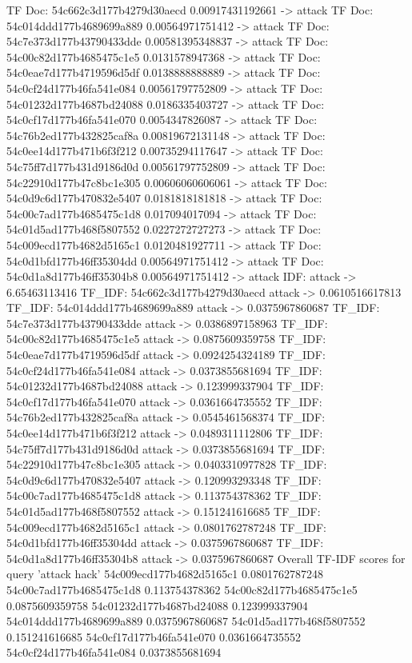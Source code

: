 \documentclass[12pt]{article}
\begin{document}
\begin{spverbatim}
TF Doc: 54c662c3d177b4279d30aecd 0.00917431192661 -> attack
TF Doc: 54c014ddd177b4689699a889 0.00564971751412 -> attack
TF Doc: 54c7e373d177b43790433dde 0.00581395348837 -> attack
TF Doc: 54c00c82d177b4685475c1e5 0.0131578947368 -> attack
TF Doc: 54c0eae7d177b4719596d5df 0.0138888888889 -> attack
TF Doc: 54c0cf24d177b46fa541e084 0.00561797752809 -> attack
TF Doc: 54c01232d177b4687bd24088 0.0186335403727 -> attack
TF Doc: 54c0cf17d177b46fa541e070 0.0054347826087 -> attack
TF Doc: 54c76b2ed177b432825caf8a 0.00819672131148 -> attack
TF Doc: 54c0ee14d177b471b6f3f212 0.00735294117647 -> attack
TF Doc: 54c75ff7d177b431d9186d0d 0.00561797752809 -> attack
TF Doc: 54c22910d177b47c8bc1e305 0.00606060606061 -> attack
TF Doc: 54c0d9c6d177b470832e5407 0.0181818181818 -> attack
TF Doc: 54c00c7ad177b4685475c1d8 0.017094017094 -> attack
TF Doc: 54c01d5ad177b468f5807552 0.0227272727273 -> attack
TF Doc: 54c009ecd177b4682d5165c1 0.0120481927711 -> attack
TF Doc: 54c0d1bfd177b46ff35304dd 0.00564971751412 -> attack
TF Doc: 54c0d1a8d177b46ff35304b8 0.00564971751412 -> attack
IDF:  attack -> 6.65463113416
TF_IDF:  54c662c3d177b4279d30aecd attack -> 0.0610516617813
TF_IDF:  54c014ddd177b4689699a889 attack -> 0.0375967860687
TF_IDF:  54c7e373d177b43790433dde attack -> 0.0386897158963
TF_IDF:  54c00c82d177b4685475c1e5 attack -> 0.0875609359758
TF_IDF:  54c0eae7d177b4719596d5df attack -> 0.0924254324189
TF_IDF:  54c0cf24d177b46fa541e084 attack -> 0.0373855681694
TF_IDF:  54c01232d177b4687bd24088 attack -> 0.123999337904
TF_IDF:  54c0cf17d177b46fa541e070 attack -> 0.0361664735552
TF_IDF:  54c76b2ed177b432825caf8a attack -> 0.0545461568374
TF_IDF:  54c0ee14d177b471b6f3f212 attack -> 0.0489311112806
TF_IDF:  54c75ff7d177b431d9186d0d attack -> 0.0373855681694
TF_IDF:  54c22910d177b47c8bc1e305 attack -> 0.0403310977828
TF_IDF:  54c0d9c6d177b470832e5407 attack -> 0.120993293348
TF_IDF:  54c00c7ad177b4685475c1d8 attack -> 0.113754378362
TF_IDF:  54c01d5ad177b468f5807552 attack -> 0.151241616685
TF_IDF:  54c009ecd177b4682d5165c1 attack -> 0.0801762787248
TF_IDF:  54c0d1bfd177b46ff35304dd attack -> 0.0375967860687
TF_IDF:  54c0d1a8d177b46ff35304b8 attack -> 0.0375967860687
Overall TF-IDF scores for query 'attack hack'
54c009ecd177b4682d5165c1 0.0801762787248
54c00c7ad177b4685475c1d8 0.113754378362
54c00c82d177b4685475c1e5 0.0875609359758
54c01232d177b4687bd24088 0.123999337904
54c014ddd177b4689699a889 0.0375967860687
54c01d5ad177b468f5807552 0.151241616685
54c0cf17d177b46fa541e070 0.0361664735552
54c0cf24d177b46fa541e084 0.0373855681694

\end{spverbatim}
\end{document}
